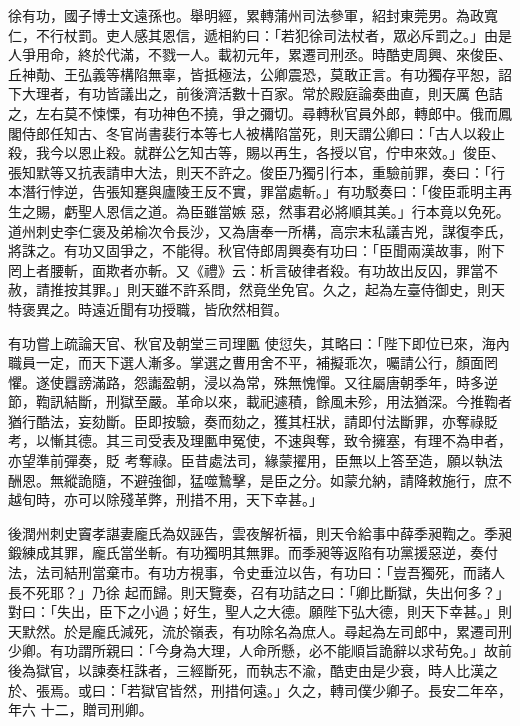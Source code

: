 \begin{pinyinscope}
 徐有功，國子博士文遠孫也。舉明經，累轉蒲州司法參軍，紹封東莞男。為政寬仁，不行杖罰。吏人感其恩信，遞相約曰：「若犯徐司法杖者，眾必斥罰之。」由是人爭用命，終於代滿，不戮一人。載初元年，累遷司刑丞。時酷吏周興、來俊臣、丘神勣、王弘義等構陷無辜，皆抵極法，公卿震恐，莫敢正言。有功獨存平恕，詔下大理者，有功皆議出之，前後濟活數十百家。常於殿庭論奏曲直，則天厲
 色詰之，左右莫不悚慄，有功神色不撓，爭之彌切。尋轉秋官員外郎，轉郎中。俄而鳳閣侍郎任知古、冬官尚書裴行本等七人被構陷當死，則天謂公卿曰：「古人以殺止殺，我今以恩止殺。就群公乞知古等，賜以再生，各授以官，佇申來效。」俊臣、張知默等又抗表請申大法，則天不許之。俊臣乃獨引行本，重驗前罪，奏曰：「行本潛行悖逆，告張知蹇與廬陵王反不實，罪當處斬。」有功駁奏曰：「俊臣乖明主再生之賜，虧聖人恩信之道。為臣雖當嫉
 惡，然事君必將順其美。」行本竟以免死。道州刺史李仁褒及弟榆次令長沙，又為唐奉一所構，高宗末私議吉兇，謀復李氏，將誅之。有功又固爭之，不能得。秋官侍郎周興奏有功曰：「臣聞兩漢故事，附下罔上者腰斬，面欺者亦斬。又《禮》云：析言破律者殺。有功故出反囚，罪當不赦，請推按其罪。」則天雖不許系問，然竟坐免官。久之，起為左臺侍御史，則天特褒異之。時遠近聞有功授職，皆欣然相賀。



 有功嘗上疏論天官、秋官及朝堂三司理匭
 使愆失，其略曰：「陛下即位已來，海內職員一定，而天下選人漸多。掌選之曹用舍不平，補擬乖次，囑請公行，顏面罔懼。遂使囂謗滿路，怨讟盈朝，浸以為常，殊無愧憚。又往屬唐朝季年，時多逆節，鞫訊結斷，刑獄至嚴。革命以來，載祀遽積，餘風未殄，用法猶深。今推鞫者猶行酷法，妄劾斷。臣即按驗，奏而劾之，獲其枉狀，請即付法斷罪，亦奪祿貶考，以慚其德。其三司受表及理匭申冤使，不速與奪，致令擁塞，有理不為申者，亦望準前彈奏，貶
 考奪祿。臣昔處法司，緣蒙擢用，臣無以上答至造，願以執法酬恩。無縱詭隨，不避強御，猛噬鷙擊，是臣之分。如蒙允納，請降敕施行，庶不越旬時，亦可以除殘革弊，刑措不用，天下幸甚。」



 後潤州刺史竇孝諶妻龐氏為奴誣告，雲夜解祈福，則天令給事中薛季昶鞫之。季昶鍛練成其罪，龐氏當坐斬。有功獨明其無罪。而季昶等返陷有功黨援惡逆，奏付法，法司結刑當棄市。有功方視事，令史垂泣以告，有功曰：「豈吾獨死，而諸人長不死耶？」乃徐
 起而歸。則天覽奏，召有功詰之曰：「卿比斷獄，失出何多？」對曰：「失出，臣下之小過；好生，聖人之大德。願陛下弘大德，則天下幸甚。」則天默然。於是龐氏減死，流於嶺表，有功除名為庶人。尋起為左司郎中，累遷司刑少卿。有功謂所親曰：「今身為大理，人命所懸，必不能順旨詭辭以求茍免。」故前後為獄官，以諫奏枉誅者，三經斷死，而執志不渝，酷吏由是少衰，時人比漢之於、張焉。或曰：「若獄官皆然，刑措何遠。」久之，轉司僕少卿子。長安二年卒，年六
 十二，贈司刑卿。




\end{pinyinscope}
